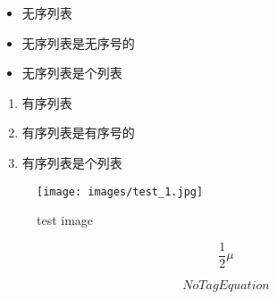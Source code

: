 \begin{itemize}
\item 无序列表
\item 无序列表是无序号的
\item 无序列表是个列表
\end{itemize}
\begin{enumerate}
\item 有序列表
\item 有序列表是有序号的
\item 有序列表是个列表
\end{enumerate}
\begin{figure}[h]
\centering
\texttt{[image: images/test\_1.jpg]}
\caption{test image}
\label{fig:images/test_1.jpg}
\end{figure}


\begin{equation}
\label{eq:eqlabel}
\frac{1}{2}\mu
\end{equation}

\begin{equation}
NoTagEquation
\end{equation}

